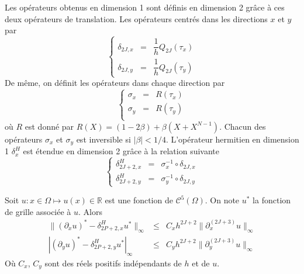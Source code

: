 Les opérateurs obtenus en dimension 1 sont définis en dimension 2 grâce à ces deux opérateurs de translation. Les opérateurs centrés dans les directions $x$ et $y$ par 
\begin{equation}
\left\lbrace
\begin{array}{rcl}
\delta_{2J,x} & = & \dfrac{1}{h} Q_{2J}(\tau_x) \\
\delta_{2J,y} & = & \dfrac{1}{h} Q_{2J}(\tau_y)
\end{array}
\right.
\label{eq:der_centrée_2D}
\end{equation}
De même, on définit les opérateurs dans chaque direction par 
\begin{equation}
\left\lbrace
\begin{array}{rcl}
\sigma_x & = & R(\tau_x) \\
\sigma_y & = & R(\tau_y) \\
\end{array}
\right.
\label{eq:simpson_2D}
\end{equation}
où $R$ est donné par $R(X) = (1-2 \beta) + \beta (X+X^{N-1})$.
Chacun des opérateurs $\sigma_x$ et $\sigma_y$ est inversible si $|\beta|<1/4$.
L'opérateur hermitien en dimension 1 $\delta_x^H$ est étendue en dimension 2 grâce à la relation suivante 
\begin{equation}
\left\lbrace
\begin{array}{rcl}
\delta_{2J+2,x}^H & = & \sigma_x^{-1} \circ \delta_{2J,x} \\
\delta_{2J+2,y}^H & = & \sigma_y^{-1} \circ \delta_{2J,y}
\end{array}
\right.
\label{eq:der_herm_2D}
\end{equation}

\begin{theoreme}
Soit $u : x \in \Omega \mapsto u(x) \in \mathbb{R}$ est une fonction de $\mathcal{C}^5 (\Omega)$. On note $u^*$ la fonction de grille associée à $u$. Alors
\begin{equation}
\begin{array}{rcl}
\|(\partial_x u)^* - \delta_{2P+2,x}^H u^*\|_{\infty} & \leq & C_x h^{2J+2} \| \partial_x^{(2J+3)}u \|_{\infty}\\
|(\partial_y u)^* - \delta_{2P+2,y}^H u^*|_{\infty} &\leq & C_y h^{2J+2} \| \partial_y^{(2J+3)}u \|_{\infty}
\end{array}
\end{equation}
Où $C_x$, $C_y$ sont des réels positifs indépendants de $h$ et de $u$.
\end{theoreme}

